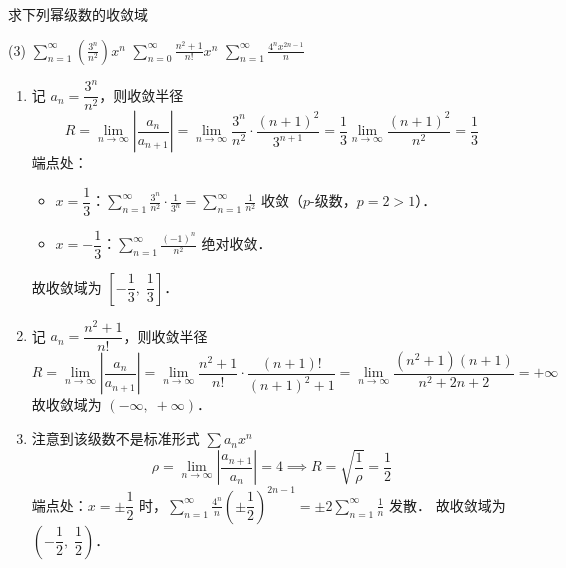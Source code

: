 \documentclass[12pt, a4paper, oneside, UTF8]{ctexbook}
\begin{document}
\begin{example}
     求下列幂级数的收敛域
     \begin{tasks}[label=(\arabic*)](3)
        \task $\displaystyle\sum_{n=1}^{\infty}\left(\frac{3^n}{n^2}\right)x^n$
        \task $\displaystyle\sum_{n=0}^{\infty}\frac{n^2+1}{n!}x^n$
        \task $\displaystyle\sum_{n=1}^{\infty}\frac{4^nx^{2n-1}}{n}$
    \end{tasks}
\end{example}
\begin{solution}
    \begin{enumerate}[label=(\arabic*)]
        \item 记 $a_n = \dfrac{3^n}{n^2}$，则收敛半径
        \[ R = \lim_{n\to\infty}\left|\frac{a_n}{a_{n+1}}\right| = \lim_{n\to\infty} \frac{3^n}{n^2}\cdot\frac{(n+1)^2}{3^{n+1}} = \frac13 \lim_{n\to\infty}\frac{(n+1)^2}{n^2} = \frac13 \]
        端点处：
        \begin{itemize}
            \item $x = \dfrac13$：$\displaystyle\sum_{n=1}^\infty \frac{3^n}{n^2}\cdot\frac{1}{3^n} = \sum_{n=1}^\infty \frac{1}{n^2}$ 收敛（$p$-级数，$p=2>1$）．
            \item $x = -\dfrac13$：$\displaystyle\sum_{n=1}^\infty \frac{(-1)^n}{n^2}$ 绝对收敛．
        \end{itemize}
        故收敛域为 $\boxed{\left[-\dfrac13,\;\dfrac13\right]}$．

        \item 记 $a_n = \dfrac{n^2+1}{n!}$，则收敛半径
        \[ R = \lim_{n\to\infty}\left|\frac{a_n}{a_{n+1}}\right| = \lim_{n\to\infty} \frac{n^2+1}{n!}\cdot\frac{(n+1)!}{(n+1)^2+1} = \lim_{n\to\infty} \frac{(n^2+1)(n+1)}{n^2+2n+2} = +\infty \]
        故收敛域为 $\boxed{(-\infty,\;+\infty)}$．

        \item 注意到该级数不是标准形式 $\sum a_n x^n$
        \[\rho = \lim_{n\to\infty}\left|\frac{a_{n+1}}{a_n}\right| = 4 \implies R = \sqrt{\frac{1}{\rho}} = \frac12\]
        端点处：$x=\pm\dfrac12$ 时，$\displaystyle\sum_{n=1}^\infty \frac{4^n}{n}\left(\pm\dfrac12\right)^{2n-1} = \pm 2\sum_{n=1}^\infty \frac{1}{n}$ 发散．
        故收敛域为 $\boxed{\left(-\dfrac12,\;\dfrac12\right)}$．
    \end{enumerate}
\end{solution}
\end{document}

